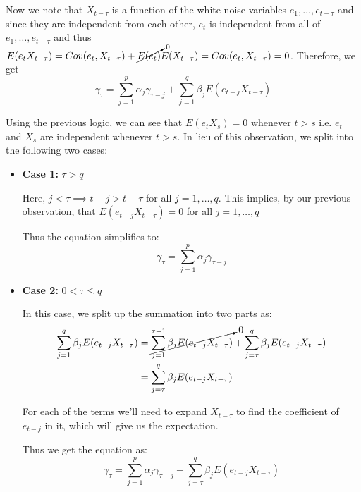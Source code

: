 \documentclass[12pt, oneside]{article}
\renewcommand{\labelitemi}{\textendash}
\begin{document}
\begin{enumerate}
{    Now we note that \(X_{t-\tau}\) is a function of the white noise variables \(e_1,\ldots,e_{t-\tau}\) and since
    they are independent from each other, \(e_t\) is independent from all of \(e_1,\ldots,e_{t-\tau}\) and thus \(E(e_t X_{t-\tau}) = Cov(e_t, X_{t-\tau}) + \cancelto{0}{E(e_t)} E(X_{t-\tau}) = Cov(e_t, X_{t-\tau}) = 0\).
    Therefore, we get
    \begin{equation}
        \gamma_{\tau} = \sum_{j=1}^{p}\alpha_j \gamma_{\tau - j} + \sum_{j=1}^{q} \beta_j E\left(e_{t-j} X_{t-\tau}\right) \label{eq:q6:arma_var}
    \end{equation}

    Using the previous logic, we can see that \(E(e_t X_s) = 0\) whenever \(t > s\) i.e. \(e_t\) and \(X_s\) are
    independent whenever \(t > s\). In lieu of this observation, we split into the following two cases:

    \renewcommand{\labelitemi}{\textendash}
    \begin{itemize}
        \item \textbf{Case 1: } \(\tau > q\)
        
        Here, \(j < \tau \implies t - j > t - \tau\) for all \(j = 1, \ldots, q\). This implies, by our previous observation,
        that \(E(e_{t-j} X_{t-\tau}) = 0\) for all \(j = 1,\ldots,q\)

        Thus the equation simplifies to:
        \begin{equation}
            \gamma_{\tau} = \sum_{j=1}^{p}\alpha_j \gamma_{\tau - j} \label{eq:q6:case1}
        \end{equation}

        \item \textbf{Case 2: } \(0 < \tau \leq q\)
        
        In this case, we split up the summation into two parts as:
        \begin{align*}
            \sum_{j=1}^{q} \beta_j E(e_{t-j} X_{t-\tau}) &= \cancelto{0}{\sum_{j=1}^{\tau - 1} \beta_j E(e_{t-j} X_{t-\tau})} + \sum_{j=\tau}^{q} \beta_j E(e_{t-j} X_{t-\tau}) \\
                &= \sum_{j=\tau}^{q} \beta_j E(e_{t-j} X_{t-\tau})
        \end{align*}

        For each of the terms we'll need to expand \(X_{t-\tau}\) to find the coefficient
        of \(e_{t-j}\) in it, which will give us the expectation.

        Thus we get the equation as:
        \begin{equation}
            \gamma_{\tau} = \sum_{j=1}^{p}\alpha_j \gamma_{\tau - j} + \sum_{j=\tau}^{q} \beta_j E(e_{t-j} X_{t-\tau})
                \label{eq:q6:case2}
        \end{equation}
    \end{itemize}

}
\end{enumerate}
\end{document}
